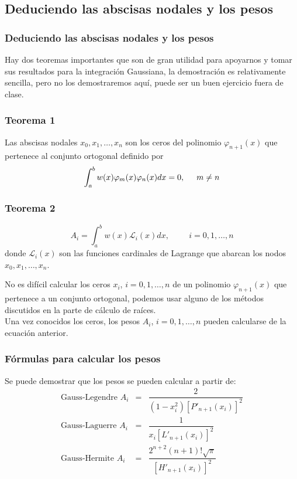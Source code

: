\subsection{Deduciendo las abscisas nodales y los pesos}
\begin{frame}
\frametitle{Deduciendo las abscisas nodales y los pesos}
Hay dos teoremas importantes que son de gran utilidad para apoyarnos y tomar sus resultados para la integración Gaussiana, la demostración es relativamente sencilla, pero no los demostraremos aquí, puede ser un buen ejercicio fuera de clase.
\end{frame}
\begin{frame}
\frametitle{Teorema 1}
\begin{miteorema}
Las abscisas nodales $x_{0},x_{1},\ldots,x_{n}$ son los ceros del polinomio $\varphi_{n+1}(x)$  que pertenece al conjunto ortogonal definido por
\[ \int_{a}^{b} w(x) \varphi_{m}(x) \varphi_{n}(x) dx = 0, \hspace{0.5cm} m \neq n \]
\end{miteorema}
\end{frame}
\begin{frame}
\frametitle{Teorema 2}
\begin{miteorema}
\[ A_{i} = \int_{a}^{b} w(x) \mathcal{L}_{i} (x) dx, \hspace{1cm} i=0,1,\ldots,n \]
donde $\mathcal{L}_{i} (x)$ son las funciones cardinales de Lagrange que abarcan los nodos $x_{0},x_{1},\ldots,x_{n}$.
\end{miteorema}
\end{frame}
\begin{frame}
No es difícil calcular los ceros $x_{i}$, $i=0,1,\ldots,n$ de un polinomio $\varphi_{n+1} (x)$ que pertenece a un conjunto ortogonal, podemos usar alguno de los métodos discutidos en la parte de cálculo de raíces.
\\
\bigskip
Una vez conocidos los ceros, los pesos $A_{i}$, $i=0,1,\ldots,n$ pueden calcularse de la ecuación anterior.
\end{frame}
\begin{frame}
\frametitle{Fórmulas para calcular los pesos}
Se puede demostrar que los pesos se pueden calcular a partir de:
\begin{eqnarray*}
\mbox{Gauss-Legendre   }  A_{i} &=& \dfrac{2}{(1-x^{2}_{i})\left[P'_{n+1} (x_{i}) \right]^{2}} \\
\mbox{Gauss-Laguerre   } A_{i} &=& \dfrac{1}{x_{i} \left[L'_{n+1} (x_{i}) \right]^{2}} \\
\mbox{Gauss-Hermite   } A_{i} &=& \dfrac{2^{n+2}(n+1)! \sqrt{\pi}}{\left[ H'_{n+1} (x_{i}) \right]^{2}}
\end{eqnarray*}
\end{frame}
